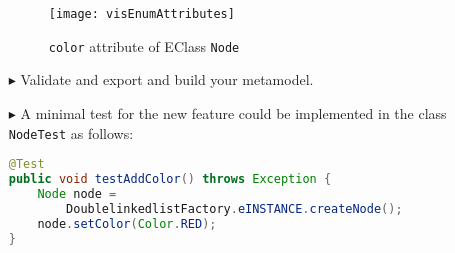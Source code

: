 \begin{itemize}
\begin{figure}[htbp]
    \begin{center} 
        \texttt{[image: visEnumAttributes]}
        \caption{\texttt{color} attribute of EClass \texttt{Node}}
        \label{enums:vis:colorAttribute}
    \end{center}
\end{figure}

\item[$\blacktriangleright$]
Validate and export and build your metamodel.

\item[$\blacktriangleright$]
A minimal test for the new feature could be implemented in the class
\texttt{NodeTest} as follows:
\begin{lstlisting}[language=Java,caption={Test for coloring nodes}]
@Test
public void testAddColor() throws Exception {
	Node node = 
	    DoublelinkedlistFactory.eINSTANCE.createNode();
	node.setColor(Color.RED);
}
\end{lstlisting}

\end{itemize}